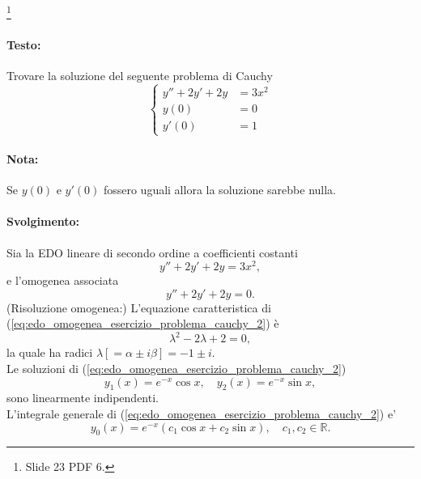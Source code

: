\begin{example}\footnote{Slide 23 PDF 6.}
	\paragraph{Testo:} Trovare la soluzione del seguente problema di Cauchy
	\begin{equation*}
		\begin{cases}
			y'' + 2y' + 2y &= 3x^2\\
			y(0) &= 0\\
			y'(0)&=1 
		\end{cases}
	\end{equation*}
	\paragraph{Nota:} Se $y(0)$ e $y'(0)$ fossero uguali allora la soluzione sarebbe nulla.
	\paragraph{Svolgimento:} Sia la EDO lineare di secondo ordine a coefficienti costanti
	\begin{equation}\label{eq:edo_completa_esercizio_problema_cauchy_2}
		y'' + 2y' + 2y = 3x^2,
	\end{equation}
	e l'omogenea associata
	\begin{equation}\label{eq:edo_omogenea_esercizio_problema_cauchy_2}
		y'' + 2y' + 2y = 0.
	\end{equation}
	(Risoluzione omogenea:) L'equazione caratteristica di (\ref{eq:edo_omogenea_esercizio_problema_cauchy_2}) è
	\begin{equation*}
		\lambda^2 - 2\lambda + 2 = 0,
	\end{equation*}
	la quale ha radici $\lambda[= \alpha \pm i\beta] = -1 \pm i$.\\
	Le soluzioni di (\ref{eq:edo_omogenea_esercizio_problema_cauchy_2})
	\begin{equation*}
		y_1(x) = e^{-x}\cos x,\quad y_2(x) = e^{-x}\sin x,
	\end{equation*}
	sono linearmente indipendenti.\\
	L'integrale generale di (\ref{eq:edo_omogenea_esercizio_problema_cauchy_2}) e'
	\begin{equation*}
		y_0(x)=e^{-x}(c_1\cos x + c_2\sin x),\quad c_1,c_2\in\mathbb{R}.
	\end{equation*}

\end{example}
